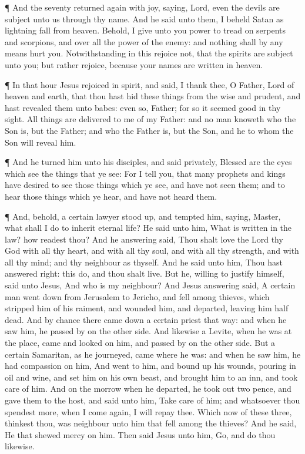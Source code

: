  ¶ And the seventy returned again with joy, saying, Lord,
even the devils are subject unto us through thy name.  And
he said unto them, I beheld Satan as lightning fall from heaven.
 Behold, I give unto you power to tread on serpents and
scorpions, and over all the power of the enemy: and nothing shall by any
means hurt you.  Notwithstanding in this rejoice not, that
the spirits are subject unto you; but rather rejoice, because your names
are written in heaven.

 ¶ In that hour Jesus rejoiced in spirit, and said, I thank
thee, O Father, Lord of heaven and earth, that thou hast hid these
things from the wise and prudent, and hast revealed them unto babes:
even so, Father; for so it seemed good in thy sight.  All
things are delivered to me of my Father: and no man knoweth who the Son
is, but the Father; and who the Father is, but the Son, and he to whom
the Son will reveal him.

 ¶ And he turned him unto his disciples, and said
privately, Blessed are the eyes which see the things that ye see:
 For I tell you, that many prophets and kings have desired
to see those things which ye see, and have not seen them; and to hear
those things which ye hear, and have not heard them.

 ¶ And, behold, a certain lawyer stood up, and tempted him,
saying, Master, what shall I do to inherit eternal life? 
He said unto him, What is written in the law? how readest thou?
 And he answering said, Thou shalt love the Lord thy God
with all thy heart, and with all thy soul, and with all thy strength,
and with all thy mind; and thy neighbour as thyself.  And
he said unto him, Thou hast answered right: this do, and thou shalt
live.  But he, willing to justify himself, said unto Jesus,
And who is my neighbour?  And Jesus answering said, A
certain man went down from Jerusalem to Jericho, and fell among thieves,
which stripped him of his raiment, and wounded him, and departed,
leaving him half dead.  And by chance there came down a
certain priest that way: and when he saw him, he passed by on the other
side.  And likewise a Levite, when he was at the place,
came and looked on him, and passed by on the other side. 
But a certain Samaritan, as he journeyed, came where he was: and when he
saw him, he had compassion on him,  And went to him, and
bound up his wounds, pouring in oil and wine, and set him on his own
beast, and brought him to an inn, and took care of him. 
And on the morrow when he departed, he took out two pence, and gave them
to the host, and said unto him, Take care of him; and whatsoever thou
spendest more, when I come again, I will repay thee.  Which
now of these three, thinkest thou, was neighbour unto him that fell
among the thieves?  And he said, He that shewed mercy on
him. Then said Jesus unto him, Go, and do thou likewise.

